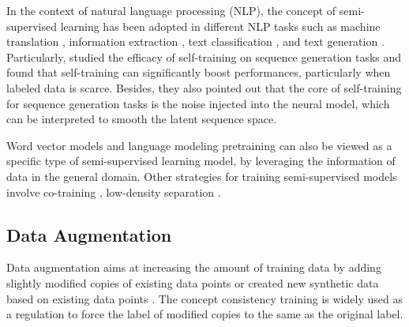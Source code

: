 \documentclass[11pt,a4paper]{article}
\begin{document}
In the context of natural language processing (NLP), the concept of semi-supervised learning has been adopted in different NLP tasks such as 
  machine translation \citep{cheng-etal-2016-semi,tu2016neural,ramachandran2016unsupervised,edunov2018understanding,clark2018semisupervised}, information extraction \citep{liao2009simple,peters2017semisupervised}, text classification \citep{nigam2006semi,dai2015semi,miyato2016adversarial,howard2018universal,karamanolakis2019leveraging,li2019learning}, and text generation \citep{zang2019semisupervised,qader2019semisupervised,shang2019semisupervised}.
Particularly, \citet{he2019revisiting} studied the efficacy of self-training on sequence generation tasks and  found that self-training can significantly boost performances, particularly when labeled data is scarce. Besides, they also pointed out that the core of self-training for sequence generation tasks is the noise injected into the neural model, which can be interpreted to smooth the latent sequence space.

Word vector models \citep{mikolov2013distributed,mikolov2013efficient,pennington2014glove,mikolov2013efficient,wordvec2014matrixfactor} and language modeling pretraining  \citep{devlin2018bert,yang2019xlnet,yinhan2019roberta,lewis2019bart,bao2020unilmv2,danqi2020spanbert} 
 can also be viewed as a specific type of semi-supervised learning model, by leveraging the information of data in the general domain. 
Other strategies for training semi-supervised models 
 involve co-training \citep{qiao2018deep,DBLP:conf/eccv/ChenZG18,han2018co},  low-density separation \citep{grandvalet2005semi,dai2017good}. 







\subsection{Data Augmentation}
Data augmentation 
aims at 
 increasing the amount of training data by adding slightly modified copies of  existing data points or  created new synthetic data based on existing data points \citep{krizhevsky2012imagenet,paulin2014transformation,laine2016temporal,sajjadi2016regularization,cubuk2018autoaugment,inoue2018data,cubuk2020randaugment}.
 The concept consistency training \citep{rasmus2015semisupervised,sajjadi2016regularization,laine2017temporal,tarvainen2018mean,miyato2018virtual,luo2018smooth,athiwaratkun2019consistent,li2019decoupled,verma2019interpolation,liu2020decoupled} is widely used as a regulation to force the label of modified copies to the same as the original label. 
 
\end{document}
